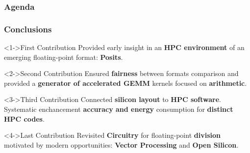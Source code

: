 \graphicspath{{./figs/}}

\begin{frame}[plain]
    \frametitle{Agenda}

    \tableofcontents[currentsection, subsectionstyle=show/shaded/hide]

\end{frame}

\begin{frame}
    \frametitle{Conclusions}
    \begin{block}<1->{First Contribution}
	    Provided early insight in an \textbf{HPC environment} of an emerging floating-point format: \textbf{Posits}.
    \end{block}
	\vspace{-1mm}
    \begin{block}<2->{Second Contribution}
	    Ensured \textbf{fairness} between formats comparison and provided a \textbf{generator of accelerated GEMM} kernels focused on \textbf{arithmetic}.
    \end{block}
	\vspace{-1mm}
    \begin{block}<3->{Third Contribution}
	    Connected \textbf{silicon layout} to \textbf{HPC software}. Systematic enchancement \textbf{accuracy and energy} consumption for \textbf{distinct HPC codes}.
    \end{block}
	\vspace{-1mm}
    \begin{block}<4->{Last Contribution}
	Revisited \textbf{Circuitry} for floating-point \textbf{division} motivated by modern opportunities: \textbf{Vector Processing} and \textbf{Open Silicon}.
    \end{block}


\end{frame}


